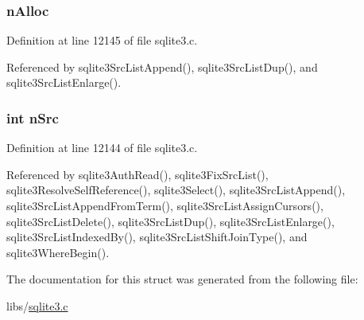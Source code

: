 \subsubsection[{n\+Alloc}]{ n\+Alloc}\label{struct_src_list_ab29b3b053096207217eb8b705a8b4816}


Definition at line 12145 of file sqlite3.\+c.



Referenced by sqlite3\+Src\+List\+Append(), sqlite3\+Src\+List\+Dup(), and sqlite3\+Src\+List\+Enlarge().

\hypertarget{struct_src_list_a2cf806e5639f0b29b62fb34e3e822248}{}
\subsubsection[{n\+Src}]{\setlength{\rightskip}{0pt plus 5cm}int n\+Src}\label{struct_src_list_a2cf806e5639f0b29b62fb34e3e822248}


Definition at line 12144 of file sqlite3.\+c.



Referenced by sqlite3\+Auth\+Read(), sqlite3\+Fix\+Src\+List(), sqlite3\+Resolve\+Self\+Reference(), sqlite3\+Select(), sqlite3\+Src\+List\+Append(), sqlite3\+Src\+List\+Append\+From\+Term(), sqlite3\+Src\+List\+Assign\+Cursors(), sqlite3\+Src\+List\+Delete(), sqlite3\+Src\+List\+Dup(), sqlite3\+Src\+List\+Enlarge(), sqlite3\+Src\+List\+Indexed\+By(), sqlite3\+Src\+List\+Shift\+Join\+Type(), and sqlite3\+Where\+Begin().



The documentation for this struct was generated from the following file\+:\begin{DoxyCompactItemize}
\item 
libs/\hyperlink{sqlite3_8c}{sqlite3.\+c}\end{DoxyCompactItemize}

